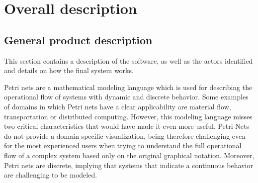 \section{Overall description}

\subsection{General product description}

This section contains a description of the software, as well as the actors identified and details on
how the final system works. 

Petri nets are a mathematical modeling language which is used for describing the operational flow of
systems with dynamic and discrete behavior. Some examples of domains in which Petri nets have a
clear applicability are material flow, transportation or distributed computing. However, this
modeling language misses two critical characteristics that would have made it even more useful.
Petri Nets do not provide a domain-specific visualization, being therefore challenging even for the
most experienced users when trying to understand the full operational flow of a complex system based
only on the original graphical notation. Moreover, Petri nets are discrete, implying that systems
that indicate a continuous behavior are challenging to be modeled.

